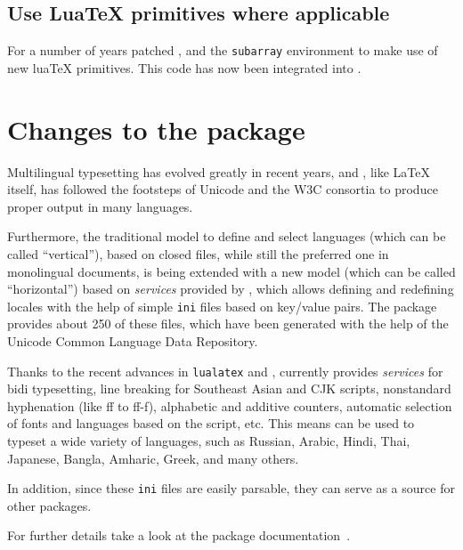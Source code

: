 \documentclass{ltnews}
\begin{document}
\subsection{Use Lua\TeX{} primitives where applicable}

For a number of years  patched ,
 and the \texttt{subarray} environment to make use of new
lua\TeX{} primitives. This code has now been integrated into
.

\section{Changes to the  package}

Multilingual typesetting has evolved greatly in recent years, and
, like \LaTeX{} itself, has followed the footsteps of
Unicode and the W3C consortia to produce proper output in many
languages.

Furthermore, the traditional model to define and select languages
(which can be called \enquote{vertical}), based on closed files, while
still the preferred one in monolingual documents, is being extended
with a new model (which can be called \enquote{horizontal}) based on
\emph{services} provided by , which allows defining and
redefining locales with the help of simple \texttt{ini} files based on
key\slash value pairs.  The  package provides about 250 of these files, which
have been generated with the help of the Unicode Common Language Data
Repository.

Thanks to the recent advances in \texttt{lualatex} and
,  currently provides \emph{services} for bidi
typesetting, line breaking for Southeast Asian and CJK scripts,
nonstandard hyphenation (like ff to ff-f), alphabetic and additive
counters, automatic selection of fonts and languages based on the
script, etc. This means  can be used to typeset a wide variety of
languages, such as Russian, Arabic, Hindi, Thai, Japanese, Bangla, Amharic,
Greek, and many others.

In addition, since these \texttt{ini} files are easily parsable, they can
serve as a source for other packages.

For further details take a look at the  package
documentation~\cite{32:babel}.
\end{document}
